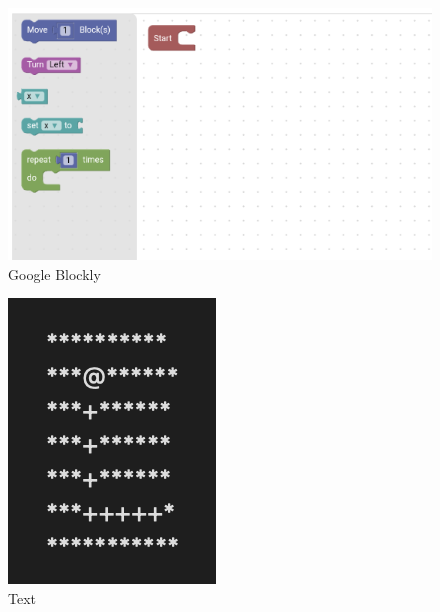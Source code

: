 \begin{figure}[h!]
\begin{center}
\includegraphics{pic/CodePanel.png}
\end{center}
\caption[Google Blockly]{Google Blockly}
\label{block}
\end{figure}


\begin{figure}[h!]
    \begin{center}
    \includegraphics{pic/text.png}
    \end{center}
    \caption[Text]{Text}
    \label{txt}
    \end{figure}

